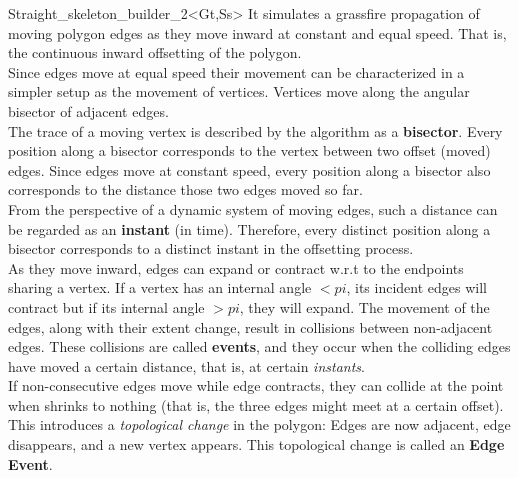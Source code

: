 \begin{ccRefClass}{Straight_skeleton_builder_2<Gt,Ss>}
It simulates  a grassfire propagation of moving polygon edges as they move inward at constant
and equal speed. That is, the continuous inward offsetting of the polygon.\\
Since edges move at equal speed their movement can be characterized in a simpler setup as the movement of vertices. Vertices move along the angular bisector of adjacent edges.\\
The trace of a moving vertex is described by the algorithm as a \textbf{bisector}. 
Every position along a bisector corresponds to the vertex between two offset (moved) edges. Since edges move at constant speed, every position along a bisector also corresponds to the distance those two edges moved so far.\\
From the perspective of a dynamic system of moving edges, such a distance can be regarded as an 
\textbf{instant} (in time). Therefore, every distinct position along a bisector corresponds to a distinct instant in the offsetting process.\\
As they move inward, edges can expand or contract w.r.t to the endpoints sharing a vertex. If a vertex has an internal angle $<pi$, its incident edges will contract but if its internal angle $>pi$, they will expand. The movement of the edges, along with their extent change, result in collisions between non-adjacent edges. These collisions are called \textbf{events}, and they occur when the colliding edges have moved a certain distance, that is, at certain \textit{instants}.\\
If non-consecutive edges  move while edge  contracts, they can collide at the point when  shrinks to nothing (that is, the three edges might meet at a certain offset). This introduces a \textit{topological change} in the polygon: Edges  are now adjacent, edge  disappears, and a new vertex appears. This topological change is called an \textbf{Edge Event}.\\

\end{ccRefClass}
